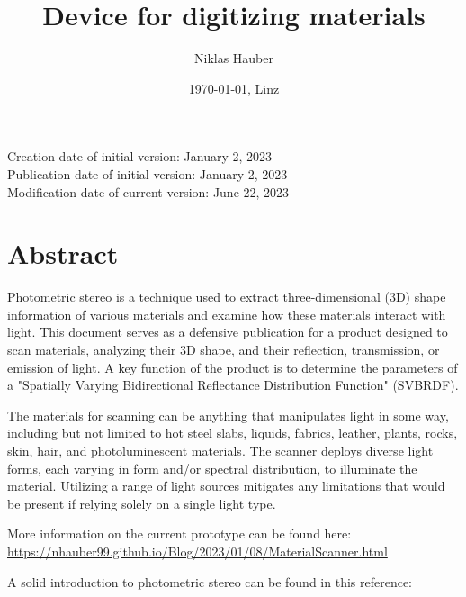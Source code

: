 \documentclass[11pt, twoside, listof=totocnumbered, bibliography=totocnumbered]{scrartcl}
\title{Device for digitizing materials}
\author{Niklas Hauber}
\date{\today{}, Linz}
\begin{document}
\maketitle
Creation date of initial version: January 2, 2023\\
Publication date of initial version: January 2, 2023\\
Modification date of current version: June 22, 2023\\

\section{Abstract}
Photometric stereo is a technique used to extract three-dimensional (3D) shape information of various materials and examine how these materials interact with light. This document serves as a defensive publication for a product designed to scan materials, analyzing their 3D shape, and their reflection, transmission, or emission of light. A key function of the product is to determine the parameters of a "Spatially Varying Bidirectional Reflectance Distribution Function" (SVBRDF).

The materials for scanning can be anything that manipulates light in some way, including but not limited to hot steel slabs, liquids, fabrics, leather, plants, rocks, skin, hair, and photoluminescent materials. The scanner deploys diverse light forms, each varying in form and/or spectral distribution, to illuminate the material. Utilizing a range of light sources mitigates any limitations that would be present if relying solely on a single light type. \cite{SURVEY}

More information on the current prototype can be found here: \\
\href{https://nhauber99.github.io/Blog/2023/01/08/MaterialScanner.html}{https://nhauber99.github.io/Blog/2023/01/08/MaterialScanner.html}

A solid introduction to photometric stereo can be found in this reference: \cite{SURVEY}
\end{document}
